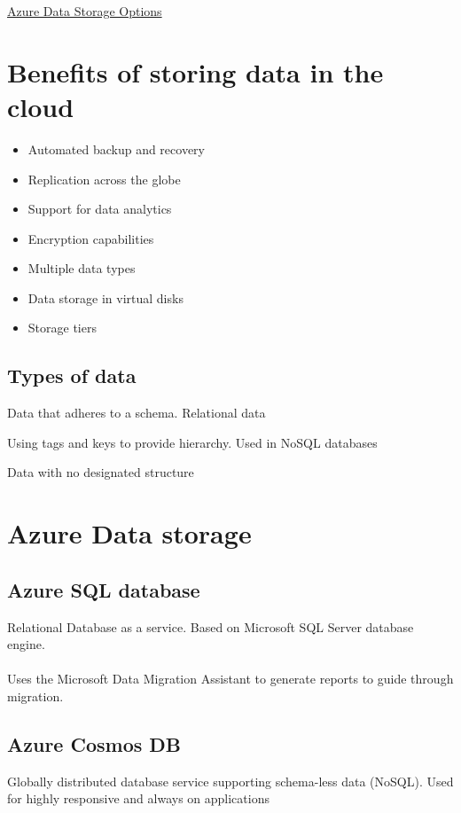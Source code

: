 \documentclass{article}[18pt]
\begin{document}
\begin{center}
\underline{\huge Azure Data Storage Options}
\end{center}
\section{Benefits of storing data in the cloud}
\begin{itemize}
	\item Automated backup and recovery
	\item Replication across the globe
	\item Support for data analytics
	\item Encryption capabilities
	\item Multiple data types
	\item Data storage in virtual disks
	\item Storage tiers
\end{itemize}
\subsection{Types of data}
\begin{definition}
	Data that adheres to a schema. Relational data
\end{definition}
\begin{definition}
	Using tags and keys to provide hierarchy. Used in NoSQL databases
\end{definition}
\begin{definition}
	Data with no designated structure
\end{definition}
\section{Azure Data storage}
\subsection{Azure SQL database}
Relational Database as a service. Based on Microsoft SQL Server database engine.\\
\\
Uses the Microsoft Data Migration Assistant to generate reports to guide through migration.
\subsection{Azure Cosmos DB}
Globally distributed database service supporting schema-less data (NoSQL). Used for highly responsive and always on applications
\end{document}
